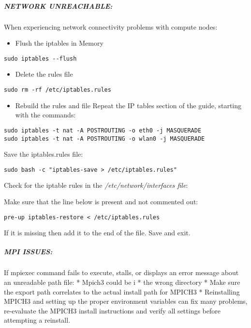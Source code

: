 \documentclass[]{article}
\providecommand{\tightlist}{%
  \setlength{\itemsep}{0pt}\setlength{\parskip}{0pt}}
\let\oldsubparagraph\subparagraph
\renewcommand{\subparagraph}[1]{\oldsubparagraph{#1}\mbox{}}
\begin{document}
\subparagraph{NETWORK UNREACHABLE:}\label{network-unreachable}

When experiencing network connectivity problems with compute nodes:

\begin{itemize}
\tightlist
\item
  Flush the iptables in Memory
\end{itemize}

\texttt{sudo\ iptables\ -\/-flush}

\begin{itemize}
\tightlist
\item
  Delete the rules file
\end{itemize}

\texttt{sudo\ rm\ -rf\ /etc/iptables.rules}

\begin{itemize}
\tightlist
\item
  Rebuild the rules and file Repeat the IP tables section of the guide,
  starting with the commands:
\end{itemize}

\begin{verbatim}
sudo iptables -t nat -A POSTROUTING -o eth0 -j MASQUERADE
sudo iptables -t nat -A POSTROUTING -o wlan0 -j MASQUERADE
\end{verbatim}

Save the iptables.rules file:

\begin{verbatim}
sudo bash -c "iptables-save > /etc/iptables.rules"
\end{verbatim}

Check for the iptable rules in the \emph{/etc/network/interfaces file}:

Make sure that the line below is present and not commented out:

\texttt{pre-up\ iptables-restore\ \textless{}\ /etc/iptables.rules}

If it is missing then add it to the end of the file. Save and exit.

\subparagraph{MPI ISSUES:}\label{mpi-issues}

If mpiexec command fails to execute, stalls, or displays an error
message about an unreadable path file: * Mpich3 could be i * the wrong
directory * Make sure the export path correlates to the actual install
path for MPICH3 * Reinstalling MPICH3 and setting up the proper
environment variables can fix many problems, re-evaluate the MPICH3
install instructions and verify all settings before attempting a
reinstall.
\end{document}
